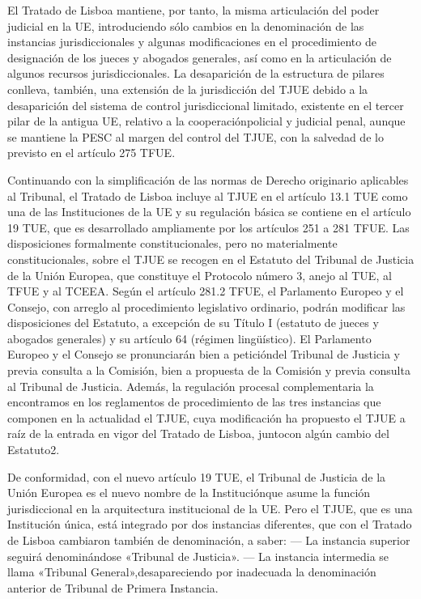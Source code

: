 \documentclass[10pt,a4paper]{article}
\begin{document}
El Tratado de Lisboa mantiene, por tanto, la misma articulación del poder judicial en la UE, introduciendo sólo cambios en la denominación de las instancias jurisdiccionales y algunas modificaciones en el procedimiento de designación de los jueces y abogados generales, así como en la articulación de algunos recursos jurisdiccionales. La desaparición de la estructura de pilares conlleva, también, una extensión de la jurisdicción del TJUE debido a la desaparición del sistema de control jurisdiccional limitado, existente en el tercer pilar de la antigua UE, relativo a la cooperaciónpolicial y judicial penal, aunque se mantiene la PESC al margen del control del TJUE, con la salvedad de lo previsto en el artículo 275 TFUE.

Continuando con la simplificación de las normas de Derecho originario aplicables al Tribunal, el Tratado de Lisboa incluye al TJUE en el artículo 13.1 TUE como una de las Instituciones de la UE y su regulación básica se contiene en el artículo 19 TUE, que es desarrollado ampliamente por los artículos 251 a 281 TFUE. Las disposiciones formalmente constitucionales, pero no materialmente constitucionales, sobre el TJUE se recogen en el Estatuto del Tribunal de Justicia de la Unión Europea, que constituye el Protocolo número 3, anejo al TUE, al TFUE y al TCEEA. Según el artículo 281.2 TFUE, el Parlamento Europeo y el Consejo, con arreglo al procedimiento legislativo ordinario, podrán modificar las disposiciones del Estatuto, a excepción de su Título I (estatuto de jueces y abogados generales) y su artículo 64 (régimen lingüístico). El Parlamento Europeo y el Consejo se pronunciarán bien a peticióndel Tribunal de Justicia y previa consulta a la Comisión, bien a propuesta de la Comisión y previa consulta al Tribunal de Justicia. Además, la regulación procesal complementaria la encontramos en los reglamentos de procedimiento de las tres instancias que componen en la actualidad el TJUE, cuya modificación ha propuesto el TJUE a raíz de la entrada en vigor del Tratado de Lisboa, juntocon algún cambio del Estatuto2.

De conformidad, con el nuevo artículo 19 TUE, el Tribunal de Justicia de la Unión Europea es el nuevo nombre de la Instituciónque asume la función jurisdiccional en la arquitectura institucional de la UE. Pero el TJUE, que es una Institución única, está integrado por dos instancias diferentes, que con el Tratado de Lisboa cambiaron también de denominación, a saber:
— La instancia superior seguirá denominándose «Tribunal de Justicia».
— La instancia intermedia se llama «Tribunal General»,desapareciendo por inadecuada la denominación anterior de Tribunal de Primera Instancia. 
\end{document}
